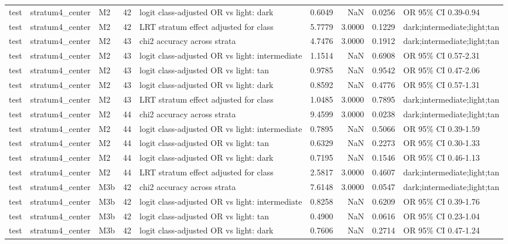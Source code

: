 \begin{tabular}{lllrlrrrl}
test & stratum4\_center & M2 & 42 & logit class-adjusted OR vs light: dark & 0.6049 & NaN & 0.0256 & OR 95\% CI 0.39-0.94 \\
test & stratum4\_center & M2 & 42 & LRT stratum effect adjusted for class & 5.7779 & 3.0000 & 0.1229 & dark;intermediate;light;tan \\
test & stratum4\_center & M2 & 43 & chi2 accuracy across strata & 4.7476 & 3.0000 & 0.1912 & dark;intermediate;light;tan \\
test & stratum4\_center & M2 & 43 & logit class-adjusted OR vs light: intermediate & 1.1514 & NaN & 0.6908 & OR 95\% CI 0.57-2.31 \\
test & stratum4\_center & M2 & 43 & logit class-adjusted OR vs light: tan & 0.9785 & NaN & 0.9542 & OR 95\% CI 0.47-2.06 \\
test & stratum4\_center & M2 & 43 & logit class-adjusted OR vs light: dark & 0.8592 & NaN & 0.4776 & OR 95\% CI 0.57-1.31 \\
test & stratum4\_center & M2 & 43 & LRT stratum effect adjusted for class & 1.0485 & 3.0000 & 0.7895 & dark;intermediate;light;tan \\
test & stratum4\_center & M2 & 44 & chi2 accuracy across strata & 9.4599 & 3.0000 & 0.0238 & dark;intermediate;light;tan \\
test & stratum4\_center & M2 & 44 & logit class-adjusted OR vs light: intermediate & 0.7895 & NaN & 0.5066 & OR 95\% CI 0.39-1.59 \\
test & stratum4\_center & M2 & 44 & logit class-adjusted OR vs light: tan & 0.6329 & NaN & 0.2273 & OR 95\% CI 0.30-1.33 \\
test & stratum4\_center & M2 & 44 & logit class-adjusted OR vs light: dark & 0.7195 & NaN & 0.1546 & OR 95\% CI 0.46-1.13 \\
test & stratum4\_center & M2 & 44 & LRT stratum effect adjusted for class & 2.5817 & 3.0000 & 0.4607 & dark;intermediate;light;tan \\
test & stratum4\_center & M3b & 42 & chi2 accuracy across strata & 7.6148 & 3.0000 & 0.0547 & dark;intermediate;light;tan \\
test & stratum4\_center & M3b & 42 & logit class-adjusted OR vs light: intermediate & 0.8258 & NaN & 0.6209 & OR 95\% CI 0.39-1.76 \\
test & stratum4\_center & M3b & 42 & logit class-adjusted OR vs light: tan & 0.4900 & NaN & 0.0616 & OR 95\% CI 0.23-1.04 \\
test & stratum4\_center & M3b & 42 & logit class-adjusted OR vs light: dark & 0.7606 & NaN & 0.2714 & OR 95\% CI 0.47-1.24 \\

\end{tabular}
